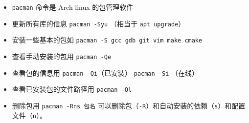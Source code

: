 
\begin{issues}
\issueDraft
\end{issues}

\begin{itemize}
\item \verb`pacman` 命令是 Arch linux 的包管理软件
\item 更新所有库的信息 \verb`pacman -Syu` （相当于 \verb`apt upgrade`）
\item 安装一些基本的包如 \verb`pacman -S gcc gdb git vim make cmake`
\item 查看手动安装的包用 \verb`pacman -Qe`
\item 查看包的信息用 \verb`pacman -Qi`（已安装） \verb`pacman -Si` （在线）
\item 查看已安装包的文件路径用 \verb`pacman -Ql`
\item 删除包用 \verb`pacman -Rns 包名` 可以删除包（\verb`-R`）和自动安装的依赖（\verb`s`）和配置文件（\verb`n`）。
\end{itemize}
